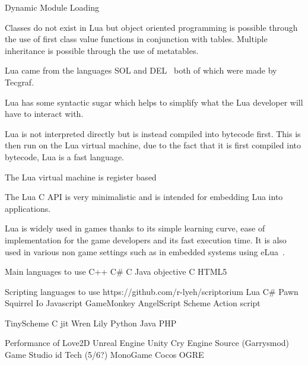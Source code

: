 \documentclass[11pt,a4paper,titlepage]{article}
\begin{document}
		Dynamic Module Loading

		Classes do not exist in Lua but object oriented programming is possible through the use of first class value functions in conjunction with tables. Multiple inheritance is possible through the use of metatables.
		
		Lua came from the languages SOL and DEL~\cite{Ierusalimschy01theevolution} both of which were made by Tecgraf.

		Lua has some syntactic sugar which helps to simplify what the Lua developer will have to interact with.

		\begin{minipage}{\linewidth}
			
		\end{minipage}

		Lua is not interpreted directly but is instead compiled into bytecode first. This is then run on the Lua virtual machine, due to the fact that it is first compiled into bytecode, Lua is a fast language.

		The Lua virtual machine is register based

		The Lua C API is very minimalistic and is intended for embedding Lua into applications.

		Lua is widely used in games thanks to its simple learning curve, ease of implementation for the game developers and its fast execution time. It is also used in various non game settings such as in embedded systems using eLua~\cite{eLua}.
		
		\newpage

		Main languages to use
			C++
			C\#
			C
			Java
			objective C
			HTML5
			

		Scripting languages to use https://github.com/r-lyeh/scriptorium
			Lua
			C\# %
			Pawn
			Squirrel
			Io
			Javascript
			GameMonkey
			AngelScript
			Scheme
			Action script

			TinyScheme
			C jit
			Wren
			Lily
			Python
			Java
			PHP
	
		Performance of
			Love2D
			Unreal 
			Engine 
			Unity 
			Cry Engine 
			Source (Garrysmod)
			Game Studio
			id Tech (5/6?)
			MonoGame
			Cocos
			OGRE
			
\newpage
\printbibliography{}
\end{document}

